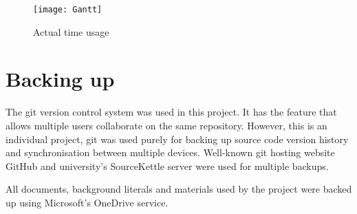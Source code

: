 \begin{figure}[H]
  \centering
  \texttt{[image: Gantt]}
  \caption{Actual time usage}
  \label{gantt}
\end{figure}

\section{Backing up}


The git version control system \cite{git} was used in this project. It has the feature that allows multiple users collaborate on the same repository. However, this is an individual project, git was used purely for backing up source code version history and synchronisation between multiple devices. Well-known git hosting website GitHub \cite{github} and university's SourceKettle server \cite{sourcekettle} were used for multiple backups.

All documents, background literals and materials used by the project were backed up using Microsoft's OneDrive service.


